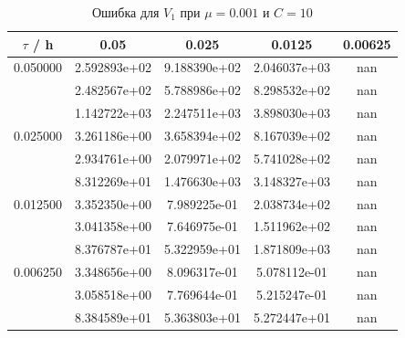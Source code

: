 \documentclass[specialist,subf,href,colorlinks=true,12pt
,times,mtpro,specialist
]{disser}
\begin{document}
\begin{table}[H]
\small
\caption{Ошибка для $V_1$ при $\mu=0.001$ и $C = 10$}
\begin{center}
\begin{tabular}{|c|c|c|c|c|}
\hline
$\tau$ / h & 0.05 & 0.025 & 0.0125 & 0.00625 \\
\hline
0.050000 & 2.592893e+02  & 9.188390e+02  & 2.046037e+03  & nan \\
 & 2.482567e+02  & 5.788986e+02  & 8.298532e+02  & nan \\
 & 1.142722e+03  & 2.247511e+03  & 3.898030e+03  & nan \\
\hline
0.025000 & 3.261186e+00  & 3.658394e+02  & 8.167039e+02  & nan \\
 & 2.934761e+00  & 2.079971e+02  & 5.741028e+02  & nan \\
 & 8.312269e+01  & 1.476630e+03  & 3.148327e+03  & nan \\
\hline
0.012500 & 3.352350e+00  & 7.989225e-01  & 2.038734e+02  & nan \\
 & 3.041358e+00  & 7.646975e-01  & 1.511962e+02  & nan \\
 & 8.376787e+01  & 5.322959e+01  & 1.871809e+03  & nan \\
\hline
0.006250 & 3.348656e+00  & 8.096317e-01  & 5.078112e-01  & nan \\
 & 3.058518e+00  & 7.769644e-01  & 5.215247e-01  & nan \\
 & 8.384589e+01  & 5.363803e+01  & 5.272447e+01  & nan \\
\hline
\end{tabular}
\end{center}
\end{table}
\end{document}
